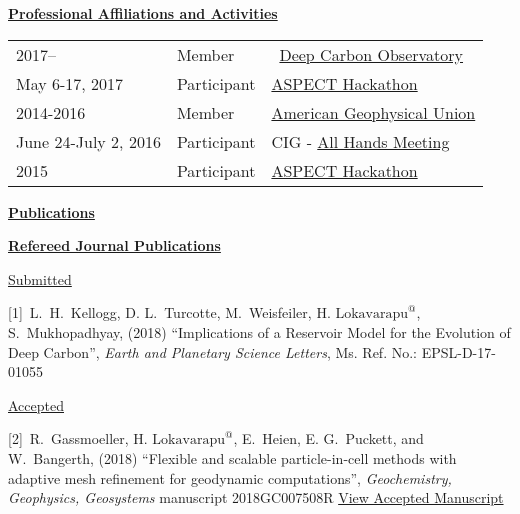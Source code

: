 \documentclass[11pt]{ltxdoc}
\begin{document}
\vskip 12pt

\begin{center}
	\textbf{\underline{Professional Affiliations and Activities}}
\end{center}

\vskip -06pt

\addtolength{\tabcolsep}{15pt}   
\begin{tabular}{lll}
  2017--     & Member & ~\href{https://deepcarbon.net/}{Deep Carbon Observatory} \\[06pt]
  May 6-17, 2017 & Participant & \href{https://geodynamics.org/cig/events/calendar/2017-aspect-hack/}{ASPECT Hackathon} \\[06pt]
  2014-2016     & Member & 
 \href{ https://sites.agu.org}{ American Geophysical Union } \\[06pt]
  June 24-July 2, 2016     & Participant & CIG - \href{https://geodynamics.org/cig/events/calendar/2016-cig-all-hands-meeting/}{All Hands Meeting} \\[06pt]
  2015     & Participant & \href{https://geodynamics.org/cig/events/calendar/2016-cig-all-hands-meeting/2016-aspect-hack/?eID=1233}{ASPECT Hackathon}\\[06pt]
  

\end{tabular}
\addtolength{\tabcolsep}{1pt}  


\begin{center}
  \textbf{\underline{Publications}}
\end{center}

\noindent
\textbf{\underline{Refereed Journal Publications}}


\noindent
\underline{Submitted}

\hangindent 20pt
[1]~L.~H.~Kellogg, D. L.~Turcotte, M.~Weisfeiler, $\textrm{H.~Lokavarapu}^@$, S.~Mukhopadhyay, (2018) 
``Implications of a Reservoir Model for the
Evolution of Deep Carbon'', 
\textit{Earth and Planetary Science Letters}, Ms. Ref. No.:  EPSL-D-17-01055

\noindent
\underline{Accepted}

\hangindent 20pt
[2]~R.~Gassmoeller,  $\textrm{H.~Lokavarapu}^@$, E.~Heien, E. G.~Puckett, and W.~Bangerth, (2018) 
``Flexible and scalable particle-in-cell methods with adaptive mesh refinement for geodynamic computations'', 
\textit{Geochemistry, Geophysics, Geosystems} manuscript 2018GC007508R 
\href{https://www.math.ucdavis.edu/~egp/PUBLICATIONS/JOURNAL_ARTICLES/ACCEPTED/RG-HL-EH-EGP-WB-2018.pdf}{View Accepted Manuscript}
\end{document}
